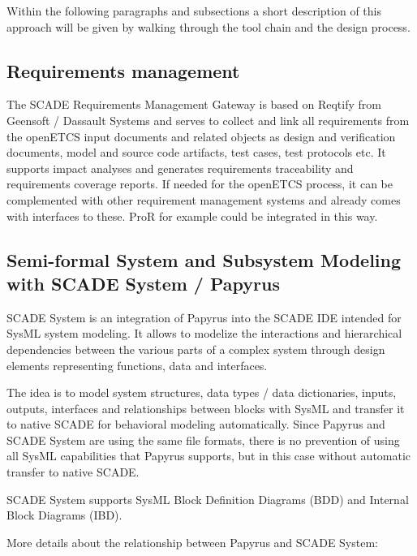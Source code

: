 Within the following paragraphs and subsections a short description of this approach will be given by walking through the tool chain and the design process. 

\subsection{Requirements management}
\label{sec:RequirementsManagement}

The SCADE Requirements Management Gateway is based on Reqtify from Geensoft / Dassault Systems and serves to collect and link all requirements from the openETCS input documents and related objects as design and verification documents, model and source code artifacts, test cases, test protocols etc. It supports impact analyses and generates requirements traceability and requirements coverage reports. 
If needed for the openETCS process, it can be complemented with other requirement management systems and already comes with interfaces to these. ProR for example could be integrated in this way. 


\subsection{Semi-formal System and Subsystem Modeling with SCADE System / Papyrus}
\label{sec:SemiformalModelling}

SCADE System is an integration of Papyrus into the SCADE IDE intended for SysML system modeling. It allows to modelize the interactions and hierarchical dependencies between the various parts of a complex system through design elements representing functions, data and interfaces. 
 
The idea is to model system structures, data types / data dictionaries, inputs, outputs, interfaces and relationships between blocks with SysML and transfer it to native SCADE for behavioral modeling automatically. Since Papyrus and SCADE System are using the same file formats, there is no prevention of using all SysML capabilities that Papyrus supports, but in this case without automatic transfer to native SCADE. 

SCADE System supports SysML Block Definition Diagrams (BDD) and	Internal Block Diagrams (IBD).

More details about the relationship between Papyrus and SCADE System: 

